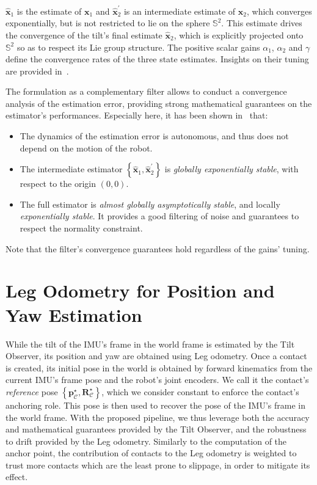 \documentclass[10pt,twocolumn]{ICCAS}
\begin{document}
$\hat{\boldsymbol{x}}_{1} $ is the estimate of $\boldsymbol{x}_{1} $ and $\hat{\boldsymbol{x}}_{2}^{\prime}$ is an intermediate estimate of $\boldsymbol{x}_{2} $, which converges exponentially, but is not restricted to lie on the sphere $\mathbb{S}^{\text{2}}$. This estimate drives the convergence of the tilt's final estimate $\hat{\boldsymbol{x}}_{2} $, which is explicitly projected onto $\mathbb{S}^{\text{2}}$ so as to respect its Lie group structure.
The positive scalar gains $\alpha_1$, $\alpha_2$ and $\gamma$ define the convergence rates of the three state estimates. Insights on their tuning are provided in~\cite{benallegue2023velocity}. 

The formulation as a complementary filter allows to conduct a convergence analysis of the estimation error, providing strong mathematical guarantees on the estimator's performances. Especially here, it has been shown in~\cite{benallegue2020LyapunovStableOrientationEstimatorHumanoids} that:
\begin{itemize}
    \item The dynamics of the estimation error is autonomous, and thus does not depend on the motion of the robot. 
    \item The intermediate estimator $\left\{\hat{\boldsymbol{x}}_{1}, \hat{\boldsymbol{x}}_{2}^{\prime} \right\}$ is \emph{globally exponentially stable}, with respect to the origin $\left(0,0\right)$.
    \item The full estimator is \emph{almost globally asymptotically stable}, and locally \emph{exponentially stable}. It provides a good filtering of noise and guarantees to respect the normality constraint.
\end{itemize}
Note that the filter's convergence guarantees hold regardless of the gains' tuning.

\section{Leg Odometry for Position and Yaw Estimation}\label{sec:Leg_odom}

While the tilt of the IMU's frame in the world frame is estimated by the Tilt Observer, its position and yaw are obtained using Leg odometry. Once a contact is created, its initial pose in the world is obtained by forward kinematics from the current IMU's frame pose and the robot's joint encoders. We call it the contact's \emph{reference} pose $\left\{ \boldsymbol{p}^{\star}_{\mathcal{C}}, \boldsymbol{R}^{\star}_{\mathcal{C}}\right\}$, which we consider constant to enforce the contact's anchoring role. This pose is then used to recover the pose of the IMU's frame in the world frame. 
With the proposed pipeline, we thus leverage both the accuracy and mathematical guarantees provided by the Tilt Observer, and the robustness to drift provided by the Leg odometry. Similarly to the computation of the anchor point, the contribution of contacts to the Leg odometry is weighted to trust more contacts which are the least prone to slippage, in order to mitigate its effect.
\end{document}
